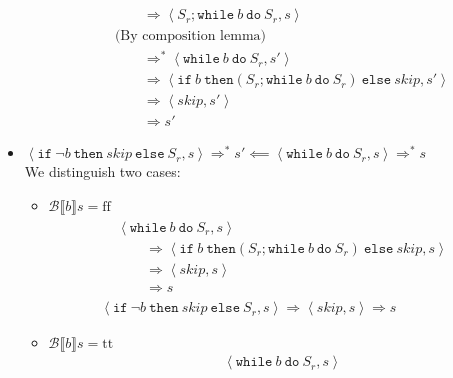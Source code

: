 \begin{exercise}
\begin{itemize}
\begin{itemize}
\begin{align*}
                    \\&\qquad\Rightarrow \left<S_r; \texttt{while}\ b\ \texttt{do}\ S_r, s\right>
                    \\&\text{(By composition lemma)}
                    \\&\qquad\Rightarrow^* \left<\texttt{while}\ b\ \texttt{do}\ S_r, s'\right>
                    \\&\qquad\Rightarrow \left<\texttt{if}\ b\ \texttt{then} (S_r; \texttt{while}\ b\ \texttt{do}\ S_r)\ \texttt{else}\ skip, s'\right>
                    \\&\qquad\Rightarrow \left<skip, s'\right>
                    \\&\qquad\Rightarrow s'
                \end{align*}
            \end{itemize}
        \item $\left<\texttt{if}\ \neg b\ \texttt{then}\ skip\ \texttt{else}\ S_r, s\right> \Rightarrow^* s' \impliedby \left<\texttt{while}\ b\ \texttt{do}\ S_r, s\right> \Rightarrow^* s$ \\
            We distinguish two cases:\begin{itemize}
                \item $\mathcal{B} \llbracket b \rrbracket s = \text{ff}$
                \begin{gather*}
                    \begin{align*}
                        &\left<\texttt{while}\ b\ \texttt{do}\ S_r, s\right>
                        \\&\qquad\Rightarrow \left<\texttt{if}\ b\ \texttt{then} (S_r; \texttt{while}\ b\ \texttt{do}\ S_r)\ \texttt{else}\ skip, s\right>
                        \\&\qquad\Rightarrow \left<skip, s\right>
                        \\&\qquad\Rightarrow s
                    \end{align*}
                    \\
                    \left<\texttt{if}\ \neg b\ \texttt{then}\ skip\ \texttt{else}\ S_r, s\right>
                    \Rightarrow
                    \left<skip, s\right>
                    \Rightarrow s
                \end{gather*}
                \item $\mathcal{B} \llbracket b \rrbracket s = \text{tt}$
                \begin{align*}
                    &\left<\texttt{while}\ b\ \texttt{do}\ S_r, s\right>

\end{align*}
\end{itemize}
\end{itemize}
\end{exercise}
